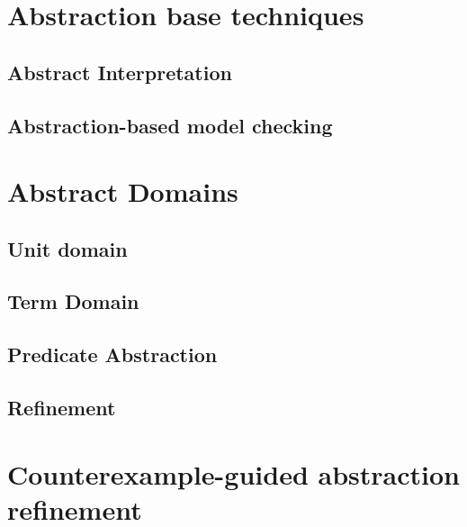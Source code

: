 



\section{Abstraction base techniques}

\subsection{Abstract Interpretation}

\subsection{Abstraction-based model checking}


\section{Abstract Domains}


\subsection{Unit domain}


\subsection{Term Domain}

\subsection{Predicate Abstraction}

\subsection{Refinement}

\section{Counterexample-guided abstraction refinement}

